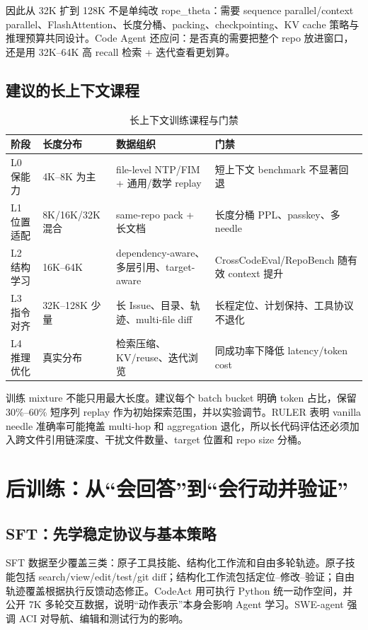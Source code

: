 \documentclass[10pt,a4paper,UTF8,fontset=none]{ctexart}
\newcommand{\ident}[1]{{\rmfamily #1}}
\begin{document}
因此从 32K 扩到 128K 不是单纯改 \ident{rope\_theta}：需要 sequence parallel/context parallel、FlashAttention、长度分桶、packing、checkpointing、KV cache 策略与推理预算共同设计。Code Agent 还应问：是否真的需要把整个 repo 放进窗口，还是用 32K--64K 高 recall 检索 + 迭代查看更划算。

\subsection{建议的长上下文课程}

\begin{table}[htbp]
\centering
\caption{长上下文训练课程与门禁}
\label{zh:tab:long-curriculum}
\small
\begin{tabularx}{\textwidth}{p{2.2cm}p{2.5cm}YY}
\toprule
阶段 & 长度分布 & 数据组织 & 门禁 \\
\midrule
L0 保能力 & 4K--8K 为主 & file-level NTP/FIM + 通用/数学 replay & 短上下文 benchmark 不显著回退 \\
L1 位置适配 & 8K/16K/32K 混合 & same-repo pack + 长文档 & 长度分桶 PPL、passkey、多 needle \\
L2 结构学习 & 16K--64K & dependency-aware、多层引用、target-aware & CrossCodeEval/RepoBench 随有效 context 提升 \\
L3 指令对齐 & 32K--128K 少量 & 长 Issue、目录、轨迹、multi-file diff & 长程定位、计划保持、工具协议不退化 \\
L4 推理优化 & 真实分布 & 检索压缩、KV/reuse、迭代浏览 & 同成功率下降低 latency/token cost \\
\bottomrule
\end{tabularx}
\end{table}

训练 mixture 不能只用最大长度。建议每个 batch bucket 明确 token 占比，保留 30\%--60\% 短序列 replay 作为初始探索范围，并以实验调节。RULER 表明 vanilla needle 准确率可能掩盖 multi-hop 和 aggregation 退化\cite{zh:hsieh2024ruler}，所以长代码评估还必须加入跨文件引用链深度、干扰文件数量、target 位置和 repo size 分桶。

\section{后训练：从“会回答”到“会行动并验证”}

\subsection{SFT：先学稳定协议与基本策略}

SFT 数据至少覆盖三类：原子工具技能、结构化工作流和自由多轮轨迹。原子技能包括 search/view/edit/test/git diff；结构化工作流包括定位--修改--验证；自由轨迹覆盖根据执行反馈动态修正。CodeAct 用可执行 Python 统一动作空间，并公开 7K 多轮交互数据，说明“动作表示”本身会影响 Agent 学习\cite{zh:wang2024codeact}。SWE-agent 强调 ACI 对导航、编辑和测试行为的影响\cite{zh:yang2024sweagent}。
\end{document}
